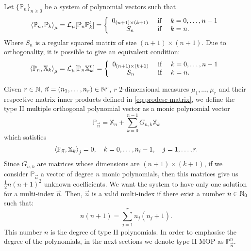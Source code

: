 \documentclass[portrait,final,a0paper,fontscale=0.38]{baposter}
\begin{document}
\begin{poster}
{\begin{multicols}{2}
  Let $\{\mathbb{P}_n\}_{n\geq 0}$ be a system of polynomial vectors such that
  $$
  \left\langle \mathbb P_n , \mathbb P_k \right\rangle_\mu = \mathcal{L}_\mu[\mathbb P_n \mathbb P_k^t]= \left\{\begin{array}{ccl}
      0_{(n+1)\times(k+1)} &   \text{ if } & k=0,\dots,n-1 \\
      S_n & \text{ if } & k=n.
  \end{array}\right. 
  $$
  Where $S_n$ is a regular squared matrix of size $(n+1)\times (n+1)$.
  Due to orthogonality, it is possible to give an equivalent condition:
  \begin{equation}
      \label{eq:prodesc-matrix-PX}
      \left\langle \mathbb P_n , \mathbb X_k \right\rangle_\mu = \mathcal{L}_\mu[\mathbb P_n \mathbb X_k^t]= \left\{\begin{array}{ccl}
          0_{(n+1)\times(k+1)} &   \text{ if } & k=0,\dots,n-1 \\
          S_n & \text{ if } & k=n.  
      \end{array}\right. 
  \end{equation}
\end{multicols}
	}
%
	{
  Given $r\in\mathbb{N}$, $\vec n = (n_1,\dots, n_r)\in\mathbb{N}^r$, $r$ $2$-dimensional measures $\mu_1, \dots, \mu_r$ and their respective matrix inner products defined in \eqref{eq:prodesc-matrix}, we define the type II multiple orthogonal polynomial vector as a monic polynomial vector $$\mathbb P_{\vec n} = \mathbb X_n + \displaystyle\sum_{k=0}^{n-1}G_{n,k} \mathbb X_k$$ which satisfies
\begin{equation}
    \label{eq:typeII-MOP-d-variables}
    \prodesc{\mathbb P_{\vec n}}{\mathbb X_k}_j = 0, \ \ \ k=0,\dots,n_i-1, \ \ \ j=1,\dots,r.
\end{equation}
Since $G_{n,k}$ are matrices whose dimensions are $(n+1)\times (k+1)$, if we consider $\mathbb P_{\vec n}$ a vector of degree $n$ monic polynomials, then this matrices give us $\frac 1 2 n (n+1)^2 $ unknown coefficients. We want the system to have only one solution for a multi-index $\vec n$. Then, $\vec n$ is a valid multi-index if there exist a number $n\in\mathbb{N}_0$ such that:
\begin{equation}
    \label{eq:condition-type-ii}
    n(n+1) = \sum_{j=1}^r n_j (n_j+1).
\end{equation}
This number $n$ is the degree of type II polynomials. In order to emphasise the degree of the polynomials, in the next sections we denote type II MOP as $\mathbb P_{\vec n}^n$.

}
\end{poster}
\end{document}
